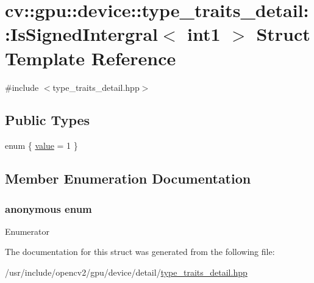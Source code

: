 \hypertarget{structcv_1_1gpu_1_1device_1_1type__traits__detail_1_1IsSignedIntergral_3_01int1_01_4}{\section{cv\-:\-:gpu\-:\-:device\-:\-:type\-\_\-traits\-\_\-detail\-:\-:Is\-Signed\-Intergral$<$ int1 $>$ Struct Template Reference}
\label{structcv_1_1gpu_1_1device_1_1type__traits__detail_1_1IsSignedIntergral_3_01int1_01_4}
}


{\ttfamily \#include $<$type\-\_\-traits\-\_\-detail.\-hpp$>$}

\subsection*{Public Types}
\begin{DoxyCompactItemize}
\item 
enum \{ \hyperlink{structcv_1_1gpu_1_1device_1_1type__traits__detail_1_1IsSignedIntergral_3_01int1_01_4_a2bdd7844d39fb0bd36e800537a8fe206afab4de54deb5a8dc15110ee22119e978}{value} = 1
 \}
\end{DoxyCompactItemize}


\subsection{Member Enumeration Documentation}
\hypertarget{structcv_1_1gpu_1_1device_1_1type__traits__detail_1_1IsSignedIntergral_3_01int1_01_4_a2bdd7844d39fb0bd36e800537a8fe206}{\subsubsection[{anonymous enum}]{\setlength{\rightskip}{0pt plus 5cm}anonymous enum}}\label{structcv_1_1gpu_1_1device_1_1type__traits__detail_1_1IsSignedIntergral_3_01int1_01_4_a2bdd7844d39fb0bd36e800537a8fe206}
\begin{Desc}
\item[Enumerator]\par
\begin{description}
\item[{\em 
\hypertarget{structcv_1_1gpu_1_1device_1_1type__traits__detail_1_1IsSignedIntergral_3_01int1_01_4_a2bdd7844d39fb0bd36e800537a8fe206afab4de54deb5a8dc15110ee22119e978}{value}\label{structcv_1_1gpu_1_1device_1_1type__traits__detail_1_1IsSignedIntergral_3_01int1_01_4_a2bdd7844d39fb0bd36e800537a8fe206afab4de54deb5a8dc15110ee22119e978}
}]\end{description}
\end{Desc}


The documentation for this struct was generated from the following file\-:\begin{DoxyCompactItemize}
\item 
/usr/include/opencv2/gpu/device/detail/\hyperlink{type__traits__detail_8hpp}{type\-\_\-traits\-\_\-detail.\-hpp}\end{DoxyCompactItemize}
